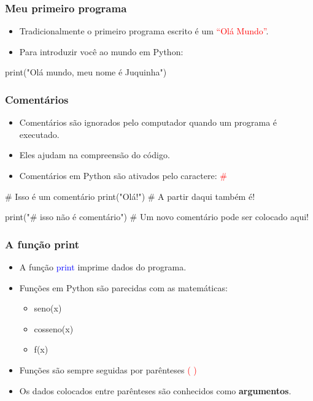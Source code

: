 \documentclass{beamer}
\begin{document}
\begin{frame}[fragile]
  \frametitle{Meu primeiro programa}  
  \begin{itemize}
    \vfill \item Tradicionalmente o primeiro programa escrito é um \textcolor{red}{``Olá Mundo''}.
    \vfill \item Para introduzir você ao mundo em Python:
  \end{itemize}

\vfill \begin{python}
print("Olá mundo, meu nome é Juquinha")
\end{python}

\end{frame}

\begin{frame}[fragile]
  \frametitle{Comentários}

  \begin{itemize}
    \vfill \item Comentários são ignorados pelo computador quando um programa é executado.
    \vfill \item Eles ajudam na compreensão do código.
    \vfill \item Comentários em Python são ativados pelo caractere: \textcolor{red}{\#}
  \end{itemize}

\vfill \begin{python}
# Isso é um comentário
print("Olá!")  # A partir daqui também é!

print("# isso não é comentário")
# Um novo comentário pode ser colocado aqui!
\end{python}

\end{frame}


\begin{frame}[fragile]
  \frametitle{A função print}

  \begin{itemize}
    \vfill \item A função \textcolor{blue}{print} imprime dados do programa.
    \vfill \item Funções em Python são parecidas com as matemáticas:
    \begin{itemize}
      \item seno(x)
      \item cosseno(x)
      \item f(x)
    \end{itemize}
    \vfill \item Funções são sempre seguidas por parênteses \textcolor{red}{(   )}
    \vfill \item Os dados colocados entre parênteses são conhecidos como \textbf{argumentos}. 
    
  \end{itemize}
\end{frame}
\end{document}
